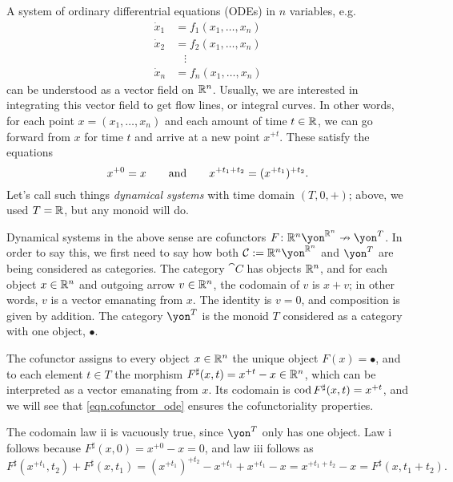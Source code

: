 \documentclass[Book-Poly]{subfiles}
\begin{document}
\begin{example}
A system of ordinary differentrial equations (ODEs) in $n$ variables, e.g.
\begin{align*}
    \dot{x}_1 &= f_1(x_1, \ldots, x_n) \\
    \dot{x}_2 &= f_2(x_1, \ldots, x_n) \\
    & \; \; \; \vdots \\
    \dot{x}_n &= f_n(x_1, \ldots, x_n)
\end{align*}
can be understood as a vector field on $\mathbb{R}^n$. Usually, we are interested in integrating this vector field to get flow lines, or integral curves. In other words, for each point $x = (x_1, \ldots, x_n)$ and each amount of time $t \in \mathbb{R}$, we can go forward from $x$ for time $t$ and arrive at a new point $x^{+t}$. These satisfy the equations
\begin{equation} \label{eqn.cofunctor_ode}
    x^{+0} = x \qquad\text{and}\qquad x^{+t_1+t_2} = (x^{+t_1})^{+t_2}. 
\end{equation}
Let's call such things \emph{dynamical systems} with time domain $(T, 0, +)$; above, we used $T = \mathbb{R}$, but any monoid will do.

Dynamical systems in the above sense are cofunctors $F \colon \rr^n \yon^{\rr^n} \cof \yon^T$.
In order to say this, we first need to say how both $\cat{C} := \rr^n \yon^{\rr^n}$ and $\yon^T$ are being considered as categories.
The category $\cat{C}$ has objects $\mathbb{R}^n$, and for each object $x \in \mathbb{R}^n$ and outgoing arrow $v \in \mathbb{R}^n$, the codomain of $v$ is $x + v$; in other words, $v$ is a vector emanating from $x$.
The identity is $v = 0$, and composition is given by addition.
The category $\yon^T$ is the monoid $T$ considered as a category with one object, $\bullet$.

The cofunctor assigns to every object $x \in \mathbb{R}^n$ the unique object $F(x) = \bullet$, and to each element $t \in T$ the morphism $F^\sharp(x, t) = x^{+t} - x \in \mathbb{R}^n$, which can be interpreted as a vector emanating from $x$.
Its codomain is $\operatorname{cod} F^\sharp(x, t) = x^{+t}$, and we will see that \eqref{eqn.cofunctor_ode} ensures the cofunctoriality properties.

The codomain law ii is vacuously true, since $\yon^T$ only has one object.
Law i follows because $F^\sharp(x, 0) = x^{+0} - x = 0$, and law iii follows as
\[
    F^\sharp(x^{+t_1}, t_2) + F^\sharp(x, t_1) = (x^{+t_1})^{+t_2} - x^{+t_1} + x^{+t_1} - x = x^{+t_1 + t_2} - x = F^\sharp(x, t_1+t_2).
\]
\end{example}
\end{document}

